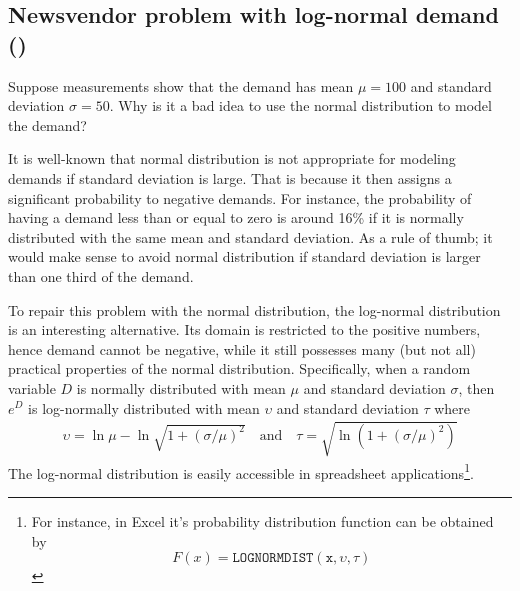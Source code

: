 
\subsection{Newsvendor problem with log-normal demand (\faRocket)}

\begin{exercise}
Suppose measurements show that the demand has mean $\mu=100$ and standard deviation $\sigma=50$. Why is it a bad idea to use the normal distribution to model the demand?
\begin{solution}
It is well-known that normal distribution is not appropriate for modeling demands if standard deviation is large. That is because it then assigns a significant probability to negative demands. For instance, the probability of having a demand less than or equal to zero is around 16\% if it is normally distributed with the same mean and standard deviation. As a rule of thumb; it would make sense to avoid normal distribution if standard deviation is larger than one third of the demand. 
\end{solution}
\end{exercise}

To repair this problem with the normal distribution, the log-normal distribution is an interesting alternative.  Its domain is restricted to the positive numbers, hence demand cannot be negative,  while it still possesses many (but not all) practical properties of the normal distribution. Specifically, when a random variable $D$ is normally distributed with mean $\mu$ and standard deviation $\sigma$, then $e^D$ is log-normally distributed with mean $\upsilon$ and standard deviation $\tau$ where 
\begin{align*}
\upsilon = \ln \mu - \ln \sqrt{1+(\sigma/\mu)^2} \quad \text{and} \quad \tau = \sqrt{\ln(1+(\sigma/\mu)^2)}
\end{align*}
The log-normal distribution is easily accessible in spreadsheet applications\footnote{For instance, in Excel it's probability distribution function can be obtained by
\begin{equation*}
F(x)=\mathtt{LOGNORMDIST(x,\upsilon,\tau)} 
\end{equation*}
}.


